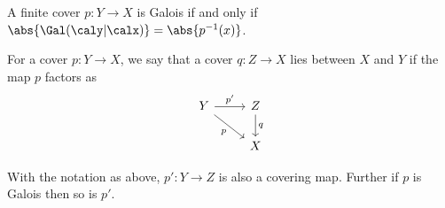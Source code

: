   \begin{corollary}
    A finite cover $p: Y \rightarrow X$ is Galois if and only if $\abs{\Gal(\caly|\calx)} = \abs{{p}^{-1}(x)}$.
  \end{corollary}

  For a cover $p:Y \rightarrow X$, we say that a cover $q:Z \rightarrow X$ lies between $X$ and $Y$ if the map $p$ factors as
  \begin{equation*}
    \begin{tikzcd}
      Y \ar[rd, "p"'] \ar[r,"p'"]& Z \ar[d, "q"]
      \\
      &X
    \end{tikzcd}
  \end{equation*}

  \begin{proposition}
    With the notation as above, $p':Y \rightarrow Z$ is also a covering map. Further if $p$ is Galois then so is $p'$.
  \end{proposition}

  

